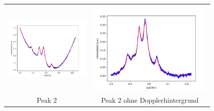 \documentclass[a4paper,parskip]{scrartcl}
\begin{document}
\begin{figure}[p]
\begin{tabular}{cc}
    \includegraphics[scale = 0.45]{./saturation/peak2/fit.png}  &  \includegraphics[scale = 0.45]{./saturation/peak2/gaussCorrected.png}  \\
    {\footnotesize Peak 2} & {\footnotesize Peak 2 ohne Dopplerhintergrund}  \\

\end{tabular}
\end{figure}
\end{document}
